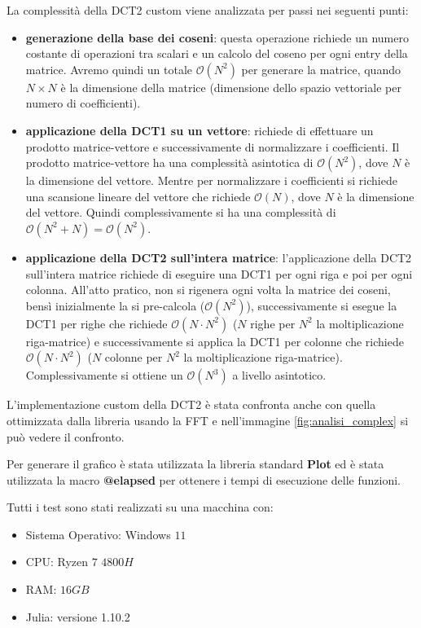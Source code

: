 La complessità della DCT2 custom viene analizzata per passi nei seguenti punti:
\begin{itemize}
    \item \textbf{generazione della base dei coseni}: questa operazione richiede
          un numero costante di operazioni tra scalari e un calcolo del coseno per ogni
          entry della matrice. Avremo quindi un totale $\mathcal{O}(N^2)$ per generare
          la matrice, quando $N\times N$ è la dimensione della matrice (dimensione dello
          spazio vettoriale per numero di coefficienti).
    \item \textbf{applicazione della DCT1 su un vettore}: richiede di effettuare un prodotto matrice-vettore e
          successivamente di normalizzare i coefficienti. Il prodotto matrice-vettore
          ha una complessità asintotica di $\mathcal{O}(N^2)$, dove $N$ è la dimensione
          del vettore. Mentre per normalizzare i coefficienti si richiede una scansione
          lineare del vettore che richiede $\mathcal{O}(N)$, dove $N$ è la dimensione
          del vettore. Quindi complessivamente si ha una complessità di $\mathcal{O}(N^2 + N) = \mathcal{O}(N^2)$.
    \item \textbf{applicazione della DCT2 sull'intera matrice}: l'applicazione della DCT2
          sull'intera matrice richiede di eseguire una DCT1 per ogni riga e poi per ogni
          colonna. All'atto pratico, non si rigenera ogni volta la matrice dei coseni,
          bensì inizialmente la si pre-calcola ($\mathcal{O}(N^2)$), successivamente si
          esegue la DCT1 per righe che richiede $\mathcal{O}(N \cdot N^2)$ ($N$ righe
          per $N^2$ la moltiplicazione riga-matrice) e successivamente si applica la
          DCT1 per colonne che richiede $\mathcal{O}(N \cdot N^2)$ ($N$ colonne
          per $N^2$ la moltiplicazione riga-matrice). Complessivamente si ottiene
          un $\mathcal{O}(N^3)$ a livello asintotico.
\end{itemize}

L'implementazione custom della DCT2 è stata confronta anche con quella ottimizzata
dalla libreria usando la FFT e nell'immagine \ref{fig:analisi_complex} si
può vedere il confronto.

Per generare il grafico è stata utilizzata la libreria standard \textbf{Plot} ed
è stata utilizzata la macro \textbf{@elapsed} per ottenere i tempi di esecuzione
delle funzioni.

Tutti i test sono stati realizzati su una macchina con:
\begin{itemize}
    \item Sistema Operativo: Windows $11$
    \item CPU: Ryzen $7$ $4800H$
    \item RAM: $16GB$
    \item Julia: versione 1.10.2
\end{itemize}

